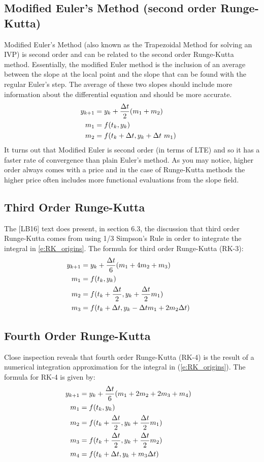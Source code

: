 \documentclass[twoside]{article}
\renewcommand{\cite}[1]{[#1]}
\begin{document}
\subsection{Modified Euler's Method (second order Runge-Kutta)}
Modified Euler's Method (also known as the Trapezoidal Method for solving an IVP) is second order and can be related to the second order Runge-Kutta method. Essentially, the modified Euler method is the inclusion of an average between the slope at the local point and the slope that can be found with the regular Euler's step. The average of these two slopes should include more information about the differential equation and should be more accurate.  
\begin{align*}
    y_{k+1} &= y_k + \frac {\Delta t}2(m_1+m_2) \cr
    m_1 &= f(t_k,y_k) \cr
    m_2 &= f(t_k + \Delta t,y_k+\Delta t\  m_1)
\end{align*}
It turns out that Modified Euler is second order (in terms of LTE) and so it has a faster rate of convergence than plain Euler's method. As you may notice, higher order always comes with a price and in the case of Runge-Kutta methods the higher price often includes more functional evaluations from the slope field. 


\subsection{Third Order Runge-Kutta}
The \cite{LB16} text does present, in section 6.3, the discussion that third order Runge-Kutta comes from using 1/3 Simpson's Rule in order to integrate the integral in \ref{e:RK_origins}. The formula for third order Runge-Kutta (RK-3): 
\begin{align*}
    y_{k+1} &= y_k + \frac {\Delta t}6(m_1+ 4m_2 +m_3) \cr
    m_1 &= f(t_k,y_k) \cr
    m_2 &= f(t_k + \frac {\Delta t}2,y_k+\frac {\Delta t}2  m_1) \cr
    m_3 &= f(t_k + \Delta t,y_k- {\Delta t}m_1 + 2m_2 \Delta t)
\end{align*}

\subsection{Fourth Order Runge-Kutta}
Close inspection reveals that fourth order Runge-Kutta (RK-4) is the result of a numerical integration approximation for the integral in (\ref{e:RK_origins}). The formula for RK-4 is given by:
\begin{align*}
    y_{k+1} &= y_k + \frac {\Delta t}6(m_1+ 2m_2 + 2m_3 +m_4) \cr
    m_1 &= f(t_k,y_k) \cr
    m_2 &= f(t_k + \frac {\Delta t}2,y_k+\frac {\Delta t}2  m_1) \cr
    m_3 &= f(t_k + \frac {\Delta t}2,y_k + \frac {\Delta t}2 m_2 ) \cr
    m_4 &= f(t_k + \Delta t,y_k +  m_3 \Delta t)
\end{align*}
\end{document}
